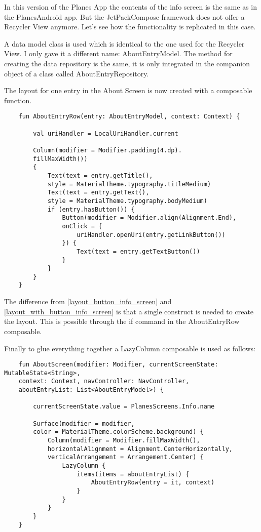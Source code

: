 In this version of the Planes App the contents of the info screen is the same as in the PlanesAndroid app. But the JetPackCompose framework does not offer a Recycler View anymore. Let's see how the functionality is replicated in this case.

A data model class is used which is identical to the one used for the Recycler View. I only gave it a different name: AboutEntryModel. The method for creating the data repository is the same, it is only integrated in the companion object of a class called AboutEntryRepository. 

The layout for one entry in the About Screen is now created with a composable function.

\begin{lstlisting}
	fun AboutEntryRow(entry: AboutEntryModel, context: Context) {
		
		val uriHandler = LocalUriHandler.current
		
		Column(modifier = Modifier.padding(4.dp).
		fillMaxWidth())
		{
			Text(text = entry.getTitle(),
			style = MaterialTheme.typography.titleMedium)
			Text(text = entry.getText(),
			style = MaterialTheme.typography.bodyMedium)
			if (entry.hasButton()) {
				Button(modifier = Modifier.align(Alignment.End),
				onClick = {
					uriHandler.openUri(entry.getLinkButton())
				}) {
					Text(text = entry.getTextButton())
				}
			}
		}
	}
\end{lstlisting}

The difference from \ref{layout_button_info_screen} and \ref{layout_with_button_info_screen} is that a single construct is needed to create the layout. This is possible through the if command in the AboutEntryRow composable.

Finally to glue everything together a LazyColumn composable is used as follows:

\begin{lstlisting}
	fun AboutScreen(modifier: Modifier, currentScreenState: MutableState<String>,
	context: Context, navController: NavController,
	aboutEntryList: List<AboutEntryModel>) {
		
		currentScreenState.value = PlanesScreens.Info.name
		
		Surface(modifier = modifier,
		color = MaterialTheme.colorScheme.background) {
			Column(modifier = Modifier.fillMaxWidth(),
			horizontalAlignment = Alignment.CenterHorizontally,
			verticalArrangement = Arrangement.Center) {
				LazyColumn {
					items(items = aboutEntryList) {
						AboutEntryRow(entry = it, context)
					}
				}
			}
		}
	}
\end{lstlisting}

